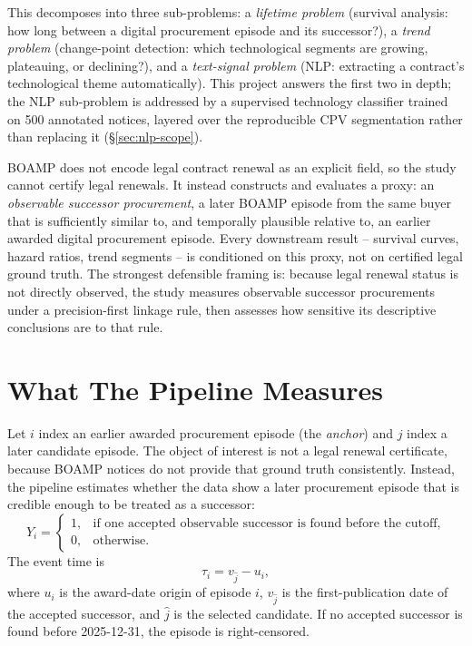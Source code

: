 \documentclass[11pt,a4paper]{article}
\begin{document}
This decomposes into three sub-problems: a \emph{lifetime problem} (survival
analysis: how long between a digital procurement episode and its successor?), a
\emph{trend problem} (change-point detection: which technological segments are
growing, plateauing, or declining?), and a \emph{text-signal problem} (NLP:
extracting a contract's technological theme automatically). This project answers
the first two in depth; the NLP sub-problem is addressed by a supervised
technology classifier trained on 500 annotated notices, layered over the
reproducible CPV segmentation rather than replacing it
(\S\ref{sec:nlp-scope}).

BOAMP does not encode legal contract renewal as an explicit field, so the study
cannot certify legal renewals. It instead constructs and evaluates a proxy: an
\emph{observable successor procurement}, a later BOAMP episode from the same
buyer that is sufficiently similar to, and temporally plausible relative to, an
earlier awarded digital procurement episode. Every downstream result --
survival curves, hazard ratios, trend segments -- is conditioned on this proxy,
not on certified legal ground truth. The strongest defensible framing is:
because legal renewal status is not directly observed, the study measures
observable successor procurements under a precision-first linkage rule, then
assesses how sensitive its descriptive conclusions are to that rule.

\section{What The Pipeline Measures}
Let \(i\) index an earlier awarded procurement episode (the \emph{anchor}) and
\(j\) index a later candidate episode. The object of interest is not a legal
renewal certificate, because BOAMP notices do not provide that ground truth
consistently. Instead, the pipeline estimates whether the data show a later
procurement episode that is credible enough to be treated as a successor:
\[
Y_i =
\begin{cases}
1, & \text{if one accepted observable successor is found before the cutoff,}\\
0, & \text{otherwise.}
\end{cases}
\]
The event time is
\[
\tau_i = v_{\hat{j}} - u_i,
\]
where \(u_i\) is the award-date origin of episode \(i\), \(v_{\hat{j}}\) is
the first-publication date of the accepted successor, and \(\hat{j}\) is the
selected candidate. If no accepted successor is found before 2025-12-31, the
episode is right-censored.
\end{document}
